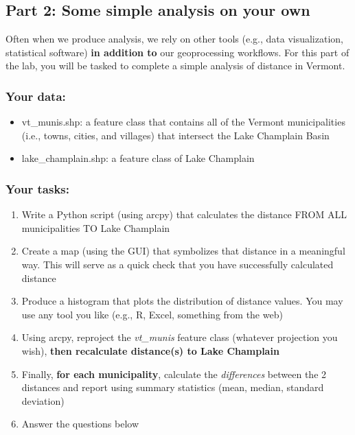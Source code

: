 \documentclass[]{article}
\providecommand{\tightlist}{%
  \setlength{\itemsep}{0pt}\setlength{\parskip}{0pt}}
\begin{document}
\newpage

\hypertarget{part-2-some-simple-analysis-on-your-own}{%
\subsection{Part 2: Some simple analysis on your
own}\label{part-2-some-simple-analysis-on-your-own}}

Often when we produce analysis, we rely on other tools (e.g., data
visualization, statistical software) \textbf{in addition to} our
geoprocessing workflows. For this part of the lab, you will be tasked to
complete a simple analysis of distance in Vermont.

\hypertarget{your-data}{%
\subsubsection{Your data:}\label{your-data}}

\begin{itemize}
\tightlist
\item
  vt\_munis.shp: a feature class that contains all of the Vermont
  municipalities (i.e., towns, cities, and villages) that intersect the
  Lake Champlain Basin
\item
  lake\_champlain.shp: a feature class of Lake Champlain
\end{itemize}

\hypertarget{your-tasks}{%
\subsubsection{Your tasks:}\label{your-tasks}}

\begin{enumerate}
\def\labelenumi{\arabic{enumi}.}
\tightlist
\item
  Write a Python script (using arcpy) that calculates the distance FROM
  ALL municipalities TO Lake Champlain
\item
  Create a map (using the GUI) that symbolizes that distance in a
  meaningful way. This will serve as a quick check that you have
  successfully calculated distance
\item
  Produce a histogram that plots the distribution of distance values.
  You may use any tool you like (e.g., R, Excel, something from the web)
\item
  Using arcpy, reproject the \emph{vt\_munis} feature class (whatever
  projection you wish), \textbf{then recalculate distance(s) to Lake
  Champlain}
\item
  Finally, \textbf{for each municipality}, calculate the
  \emph{differences} between the 2 distances and report using summary
  statistics (mean, median, standard deviation)
\item
  Answer the questions below
\end{enumerate}
\end{document}

